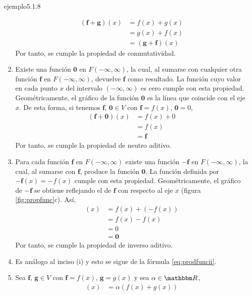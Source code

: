 \begin{examplebox}{}{ejemplo5.1.8}
\begin{enumerate}[label=\roman*), topsep=6pt, itemsep=0pt]
\begin{align*}
            (\mathbf{f} + \mathbf{g})(x) & = f(x) + g(x) \\
            & = g(x) + f(x) \\
            & = (\mathbf{g} + \mathbf{f})(x)
        \end{align*}
        Por tanto, se cumple la propiedad de conmutatividad.
        \item Existe una función $\mathbf{0}$ en $F(-\infty, \infty)$, la cual, al sumarse con cualquier otra función $\mathbf{f}$ en $F(-\infty, \infty)$, devuelve $\mathbf{f}$ como resultado. La función cuyo valor en cada punto $x$ del intervalo $(-\infty, \infty)$ es cero cumple con esta propiedad. Geométricamente, el gráfico de la función $\mathbf{0}$ es la línea que coincide con el eje $x$. De esta forma, si tenemos $\mathbf{f}$, $\mathbf{0} \in V$ con $\mathbf{f} = f(x)$, $\mathbf{0} = 0$,
        \begin{align*}
            (\mathbf{f} + \mathbf{0})(x) & = f(x) + 0 \\
            & = f(x) \\
            & = \mathbf{f}
        \end{align*}
        Por tanto, se cumple la propiedad de neutro aditivo.
        \item Para cada función $\mathbf{f}$ en $F(-\infty, \infty)$ existe una función $-\mathbf{f}$ en $F(-\infty, \infty)$, la cual, al sumarse con $\mathbf{f}$, produce la función $\mathbf{0}$. La función definida por $-\mathbf{f}(x) = -f(x)$ cumple con esta propiedad. Geométricamente, el gráfico de $-\mathbf{f}$ se obtiene reflejando el de $\mathbf{f}$ con respecto al eje $x$ (figura \ref{fig:propfunc}c). Así,
        \begin{align*}
            [\mathbf{f} + (-\mathbf{f})](x) & = f(x) + (-f(x)) \\
            & = f(x) - f(x) \\
            & = 0 \\
            & = \mathbf{0}
        \end{align*}
        Por tanto, se cumple la propiedad de inverso aditivo.
        \item Es análogo al inciso (i) y esto se sigue de la fórmula \eqref{eq:prodfuncii}.
        \item Sea $\mathbf{f}$, $\mathbf{g} \in V$ con $\mathbf{f} = f(x)$, $\mathbf{g} = g(x)$ y sea $\alpha \in \RR$,
        \begin{align*}
            [\alpha \cdot (\mathbf{f} + \mathbf{g})](x) & = \alpha (f(x) + g(x)) \\

\end{align*}
\end{enumerate}
\end{examplebox}
